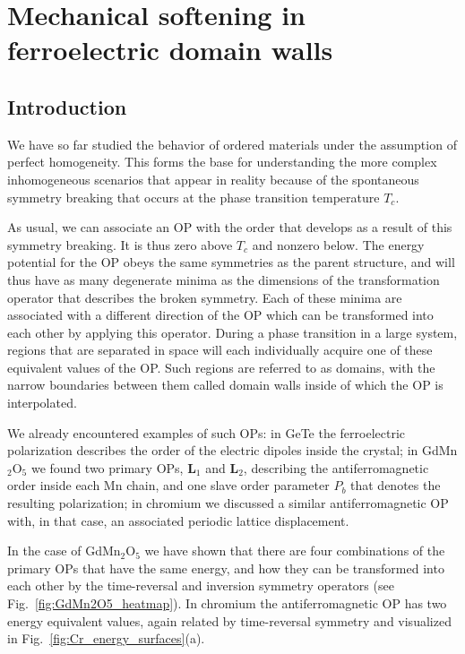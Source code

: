 \chapter{Mechanical softening in ferroelectric domain walls \label{ch:Softening}}
\section{Introduction}
We have so far studied the behavior of ordered materials under the assumption of perfect homogeneity.
This forms the base for understanding the more complex inhomogeneous scenarios that appear in reality because of the spontaneous symmetry breaking that occurs at the phase transition temperature $T_c$.

As usual, we can associate an \gls{OP} with the order that develops as a result of this symmetry breaking. It is thus zero above $T_c$ and nonzero below.
The energy potential for the \gls{OP} obeys the same symmetries as the parent structure, and will thus have as many degenerate minima as the dimensions of the transformation operator that describes the broken symmetry.
Each of these minima are associated with a different direction of the \gls{OP} which can be transformed into each other by applying this operator.
During a phase transition in a large system, regions that are separated in space will each individually acquire one of these equivalent values of the \gls{OP}.
Such regions are referred to as domains, with the narrow boundaries between them called domain walls inside of which the \gls{OP} is interpolated.

We already encountered examples of such OPs: in GeTe the ferroelectric polarization describes the order of the electric dipoles inside the crystal; in GdMn$_2$O$_5$ we found two primary OPs, $\bm{L}_1$ and $\bm{L}_2$, describing the antiferromagnetic order inside each Mn chain, and one slave order parameter $P_b$ that denotes the resulting polarization; in chromium we discussed a similar antiferromagnetic \gls{OP} with, in that case, an associated periodic lattice displacement.

In the case of GdMn$_2$O$_5$ we have shown that there are four combinations of the primary OPs that have the same energy, and how they can be transformed into each other by the time-reversal and inversion symmetry operators (see Fig.~\ref{fig:GdMn2O5_heatmap}). 
In chromium the antiferromagnetic \gls{OP} has two energy equivalent values, again related by time-reversal symmetry and visualized in Fig.~\ref{fig:Cr_energy_surfaces}(a).


